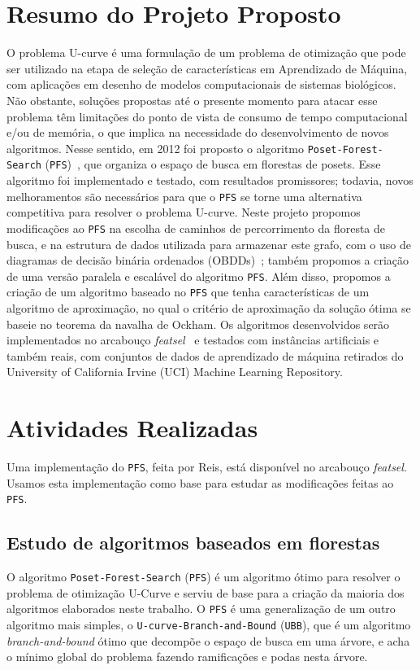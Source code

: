 \documentclass[12pt]{article}
\newcommand{\foreignword}[1]{\textit{#1}}
\newcommand{\toolname}[1]{\textit{#1}}
\newcommand{\algname}[1]{\texttt{#1}}
\begin{document}
\section{Resumo do Projeto Proposto} \label{sec:resumo} %
O problema U-curve é uma formulação de um problema de otimização que 
pode ser utilizado na etapa de seleção de características em 
Aprendizado de Máquina, com aplicações em desenho de modelos 
computacionais de sistemas biológicos. Não obstante, soluções propostas 
até o presente momento para atacar esse problema têm limitações do 
ponto de vista de consumo de tempo computacional e/ou de memória, o que 
implica na necessidade do desenvolvimento de novos algoritmos. Nesse 
sentido, em 2012 foi proposto o algoritmo 
\algname{Poset\--Forest\--Search} (\algname{PFS})~\cite{msreis thesis}, 
que organiza o espaço de busca em florestas de posets. Esse algoritmo 
foi implementado e testado, com resultados promissores; todavia, novos 
melhoramentos são necessários para que o \algname{PFS} se torne uma 
alternativa competitiva para resolver o problema U-curve. Neste projeto 
propomos modificações ao \algname{PFS} na escolha de caminhos de 
percorrimento da floresta de busca, e na estrutura de dados utilizada 
para armazenar este grafo, com o uso de diagramas de decisão binária 
ordenados (OBDDs)~\cite{bryant}; também propomos a criação 
de uma versão paralela e escalável do algoritmo \algname{PFS}. Além 
disso, propomos a criação de um algoritmo baseado no \algname{PFS} que 
tenha características de um algoritmo de aproximação, no qual o critério 
de aproximação da solução ótima se baseie no teorema da navalha de 
Ockham. Os algoritmos desenvolvidos serão implementados no arcabouço 
\toolname{featsel}~\cite{featsel paper} e testados com instâncias 
artificiais e também reais, com conjuntos de dados de aprendizado de 
máquina retirados do University of California Irvine (UCI) Machine 
Learning Repository.

 
\section{Atividades Realizadas}

Uma implementação do \algname{PFS}, feita por Reis, está disponível no
arcabouço \toolname{featsel}. Usamos esta implementação como base para
estudar as modificações feitas ao \algname{PFS}.

\subsection{Estudo de algoritmos baseados em florestas}
O algoritmo \algname{Poset\--Forest\--Search} (\algname{PFS}) é um 
algoritmo ótimo para resolver o problema de otimização U-Curve e serviu 
de base para a criação da maioria dos algoritmos elaborados neste 
trabalho. O \algname{PFS} é uma generalização de um outro algoritmo mais
simples, o \algname{U-curve-Branch-and-Bound} (\algname{UBB}), que é
um algoritmo \foreignword{branch-and-bound} ótimo que decompõe o espaço
de busca em uma árvore, e acha o mínimo global do problema fazendo 
ramificações e podas nesta árvore.
\end{document}
